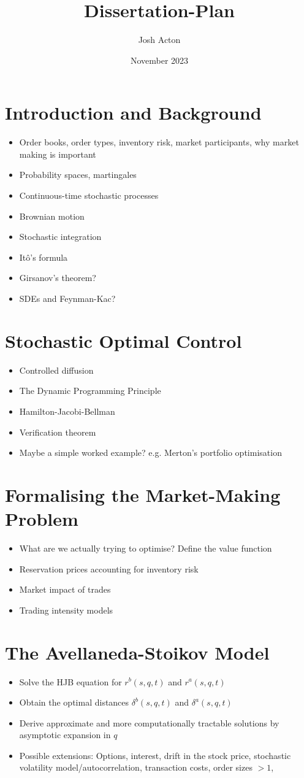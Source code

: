 \documentclass{article}
\title{Dissertation-Plan}
\author{Josh Acton}
\date{November 2023}
\begin{document}
\section{Introduction and Background}
\begin{itemize}
    \item Order books, order types, inventory risk, market participants, why market making is important
    \item Probability spaces, martingales
    \item Continuous-time stochastic processes
    \item Brownian motion
    \item Stochastic integration
    \item It\^{o}'s formula
    \item Girsanov's theorem?
    \item SDEs and Feynman-Kac?
\end{itemize}
\section{Stochastic Optimal Control}
\begin{itemize}
    \item Controlled diffusion
    \item The Dynamic Programming Principle
    \item Hamilton-Jacobi-Bellman 
    \item Verification theorem
    \item Maybe a simple worked example? e.g. Merton's portfolio optimisation
\end{itemize}
\section{Formalising the Market-Making Problem}
\begin{itemize}
    \item What are we actually trying to optimise? Define the value function
    \item Reservation prices accounting for inventory risk
    \item Market impact of trades
    \item Trading intensity models
\end{itemize}
\section{The Avellaneda-Stoikov Model}
\begin{itemize}
    \item Solve the HJB equation for $r^b(s,q,t)$ and $r^a(s,q,t)$
    \item Obtain the optimal distances $\delta^b(s,q,t)$ and $\delta^a(s,q,t)$
    \item Derive approximate and more computationally tractable solutions by asymptotic expansion in $q$
    \item Possible extensions: Options, interest, drift in the stock price, stochastic volatility model/autocorrelation, transaction costs, order sizes $> 1$,
\end{itemize}
\end{document}
